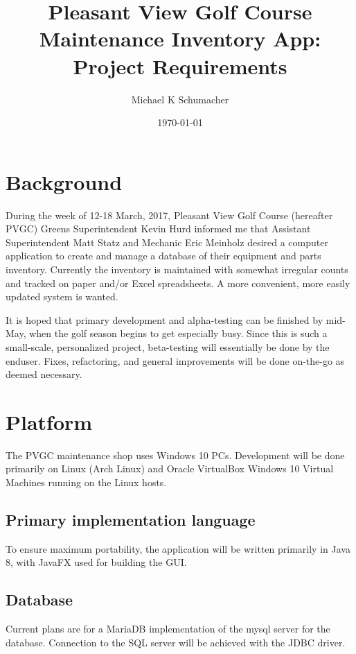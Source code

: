 \documentclass[titlepage]{article}
\title{Pleasant View Golf Course Maintenance Inventory App: \\ Project Requirements}
\author{Michael K Schumacher}
\date{\today}
\begin{document}
    \maketitle

    \vspace{20pt}

    \section{Background}
        During the week of 12-18 March, 2017, Pleasant View Golf Course (hereafter PVGC) Greens
        Superintendent Kevin Hurd informed me that Assistant Superintendent Matt Statz and
        Mechanic Eric Meinholz desired a computer application to create and manage a database of
        their equipment and parts inventory. Currently the inventory is maintained with somewhat
        irregular counts and tracked on paper and/or Excel spreadsheets. A more convenient, more
        easily updated system is wanted.

        It is hoped that primary development and alpha-testing can be finished by mid-May, when
        the golf season begins to get especially busy. Since this is such a small-scale,
        personalized project, beta-testing will essentially be done by the enduser. Fixes,
         refactoring, and general improvements will be done on-the-go as deemed necessary.

    \section{Platform}
        The PVGC maintenance shop uses Windows 10 PCs. Development will be done primarily on Linux
        (Arch Linux) and Oracle VirtualBox Windows 10 Virtual Machines running on the Linux hosts.

        \subsection{Primary implementation language}
            To ensure maximum portability, the application will be written primarily in Java 8,
            with JavaFX used for building the GUI.

        \subsection{Database}
            Current plans are for a MariaDB implementation of the mysql server for the database.
            Connection to the SQL server will be achieved with the JDBC driver.
\end{document}
